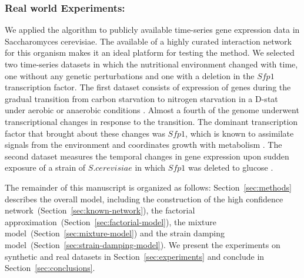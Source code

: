 \documentclass{bioinfo}
\begin{document}
\subsubsection{Real world Experiments:} We applied the algorithm to publicly available time-series gene expression
data in Saccharomyces cerevisiae. The available of a highly curated
interaction network for this organism makes it an ideal platform for
testing the method. We selected two time-series datasets in which the
nutritional environment changed with time, one without any genetic
perturbations and one with a deletion in the $Sfp1$ transcription
factor. The first dataset consists of expression of genes during the
gradual transition from carbon starvation to nitrogen starvation in a
D-stat under aerobic or anaerobic conditions . Almost a fourth of the genome underwent transcriptional changes
in response to the transition. The dominant transcription factor that
brought about these changes was $Sfp1$, which is known to assimilate
signals from the environment and coordinates growth with metabolism
. The second dataset measures the temporal
changes in gene expression upon sudden exposure of a strain of
$S. cerevisiae$ in which $Sfp1$ was deleted to glucose .

The remainder of this manuscript is organized as follows:
Section~\ref{sec:methods} describes the overall model, including the construction of the high
confidence network~(Section~\ref{sec:known-network}), the factorial
approximation~(Section~\ref{sec:factorial-model}), the mixture
model~(Section~\ref{sec:mixture-model}) and the strain damping
model~(Section~\ref{sec:strain-damping-model}). We present the experiments on synthetic and
real datasets in Section~\ref{sec:experiments} and conclude in
Section~\ref{sec:conclusions}.


\end{document}
